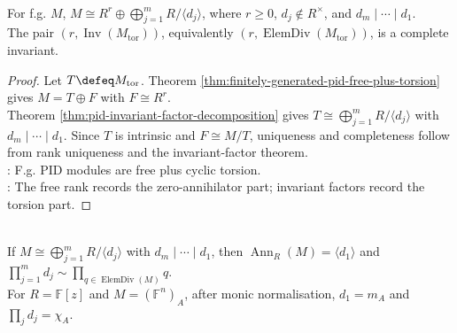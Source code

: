 \begin{corollary} \label{cor:general-finitely-generated-pid-module-classification} \\
For f.g. $M$, $M\cong R^r\oplus\bigoplus_{j=1}^mR/\langle d_j\rangle$, where $r\geq0$, $d_j\notin R^\times$, and $d_m\mid\cdots\mid d_1$.\\
The pair $(r,\operatorname{Inv}(M_{\operatorname{tor}}))$, equivalently $(r,\operatorname{ElemDiv}(M_{\operatorname{tor}}))$, is a complete invariant.
\begin{proof} Let $T\defeq M_{\operatorname{tor}}$. Theorem \ref{thm:finitely-generated-pid-free-plus-torsion} gives $M=T\oplus F$ with $F\cong R^r$.\\
Theorem \ref{thm:pid-invariant-factor-decomposition} gives $T\cong\bigoplus_{j=1}^mR/\langle d_j\rangle$ with $d_m\mid\cdots\mid d_1$. Since $T$ is intrinsic and $F\cong M/T$, uniqueness and completeness follow from rank uniqueness and the invariant-factor theorem.\\
: F.g. PID modules are free plus cyclic torsion.\\
: The free rank records the zero-annihilator part; invariant factors record the torsion part.
\end{proof}
\end{corollary}

\begin{perspective} \label{per:invariant-factors-order-and-characteristic-polynomial} \\
If $M\cong\bigoplus\limits_{j=1}^mR/\langle d_j\rangle$ with $d_m\mid\cdots\mid d_1$, then $\operatorname{Ann}_R(M)=\langle d_1\rangle$ and $\prod\limits_{j=1}^md_j\sim\prod_{q\in\operatorname{ElemDiv}(M)}q$.\\
For $R=\mathbb{F}[z]$ and $M=(\mathbb{F}^n)_A$, after monic normalisation, $d_1=m_A$ and $\prod\limits_jd_j=\chi_A$.
\end{perspective}

